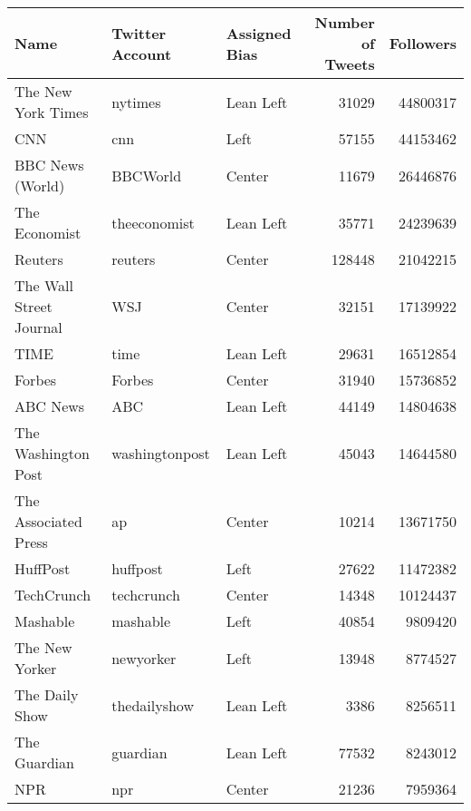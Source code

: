 \begin{tabular}{lllrr}
\toprule
                    Name &  Twitter Account & Assigned Bias &  Number of Tweets &  Followers \\
\midrule
      The New York Times &          nytimes &     Lean Left &             31029 &   44800317 \\
                     CNN &              cnn &          Left &             57155 &   44153462 \\
        BBC News (World) &         BBCWorld &        Center &             11679 &   26446876 \\
           The Economist &     theeconomist &     Lean Left &             35771 &   24239639 \\
                 Reuters &          reuters &        Center &            128448 &   21042215 \\
 The Wall Street Journal &              WSJ &        Center &             32151 &   17139922 \\
                    TIME &             time &     Lean Left &             29631 &   16512854 \\
                  Forbes &           Forbes &        Center &             31940 &   15736852 \\
                ABC News &              ABC &     Lean Left &             44149 &   14804638 \\
     The Washington Post &   washingtonpost &     Lean Left &             45043 &   14644580 \\
    The Associated Press &               ap &        Center &             10214 &   13671750 \\
                HuffPost &         huffpost &          Left &             27622 &   11472382 \\
              TechCrunch &       techcrunch &        Center &             14348 &   10124437 \\
                Mashable &         mashable &          Left &             40854 &    9809420 \\
          The New Yorker &        newyorker &          Left &             13948 &    8774527 \\
          The Daily Show &     thedailyshow &     Lean Left &              3386 &    8256511 \\
            The Guardian &         guardian &     Lean Left &             77532 &    8243012 \\
                     NPR &              npr &        Center &             21236 &    7959364 \\

\end{tabular}
